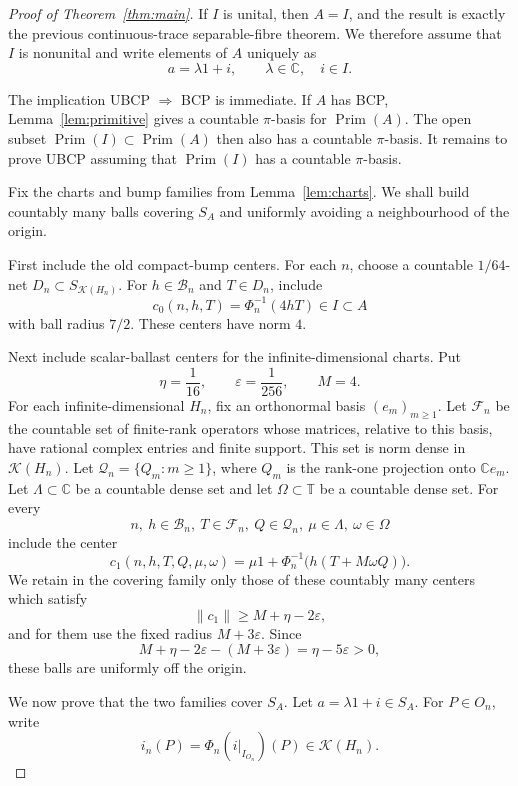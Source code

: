 \documentclass[11pt]{article}
\newcommand{\C}{\mathbb C}
\newcommand{\Kcal}{\mathcal K}
\newcommand{\Prim}{\operatorname{Prim}}
\begin{document}
\begin{proof}[Proof of Theorem~\ref{thm:main}]
If \(I\) is unital, then \(A=I\), and the result is exactly the previous
continuous-trace separable-fibre theorem.  We therefore assume that \(I\) is
nonunital and write elements of \(A\) uniquely as
\[
        a=\lambda 1+i,\qquad \lambda\in\C,\quad i\in I.
\]

The implication UBCP \(\Rightarrow\) BCP is immediate.  If \(A\) has BCP,
Lemma~\ref{lem:primitive} gives a countable \(\pi\)-basis for \(\Prim(A)\).
The open subset \(\Prim(I)\subset\Prim(A)\) then also has a countable
\(\pi\)-basis.  It remains to prove UBCP assuming that \(\Prim(I)\) has a
countable \(\pi\)-basis.

Fix the charts and bump families from Lemma~\ref{lem:charts}.  We shall build
countably many balls covering \(S_A\) and uniformly avoiding a neighbourhood of
the origin.

First include the old compact-bump centers.  For each \(n\), choose a
countable \(1/64\)-net \(D_n\subset S_{\Kcal(H_n)}\).  For \(h\in\mathcal B_n\)
and \(T\in D_n\), include
\[
        c_0(n,h,T)=\Phi_n^{-1}(4hT)\in I\subset A
\]
with ball radius \(7/2\).  These centers have norm \(4\).

Next include scalar-ballast centers for the infinite-dimensional charts.  Put
\[
        \eta=\frac1{16},\qquad \varepsilon=\frac1{256},\qquad M=4.
\]
For each infinite-dimensional \(H_n\), fix an orthonormal basis
\((e_m)_{m\ge1}\).  Let \(\mathcal F_n\) be the countable set of finite-rank
operators whose matrices, relative to this basis, have rational complex
entries and finite support.  This set is norm dense in \(\Kcal(H_n)\).  Let
\(\mathcal Q_n=\{Q_m:m\ge1\}\), where \(Q_m\) is the rank-one projection onto
\(\C e_m\).  Let \(\Lambda\subset\C\) be a countable dense set and let
\(\Omega\subset\mathbb T\) be a countable dense set.  For every
\[
        n,\ h\in\mathcal B_n,\ T\in\mathcal F_n,\ Q\in\mathcal Q_n,\ 
        \mu\in\Lambda,\ \omega\in\Omega
\]
include the center
\[
        c_1(n,h,T,Q,\mu,\omega)=
        \mu1+\Phi_n^{-1}\bigl(h(T+M\omega Q)\bigr).
\]
We retain in the covering family only those of these countably many centers
which satisfy
\[
        \|c_1\|\ge M+\eta-2\varepsilon,
\]
and for them use the fixed radius \(M+3\varepsilon\).  Since
\[
        M+\eta-2\varepsilon-(M+3\varepsilon)=\eta-5\varepsilon>0,
\]
these balls are uniformly off the origin.

We now prove that the two families cover \(S_A\).  Let \(a=\lambda1+i\in S_A\).
For \(P\in O_n\), write
\[
        i_n(P)=\Phi_n(i|_{I_{O_n}})(P)\in\Kcal(H_n).
\]


\end{proof}
\end{document}

